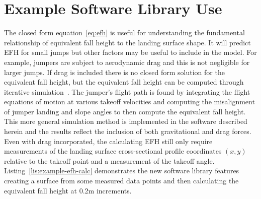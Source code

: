 \documentclass[smallextended]{svjour3}       %
\begin{document}
\appendix

\section{Example Software Library Use}
\label{sec:example}
%
The closed form equation~\ref{eq:efh} is useful for understanding the
fundamental relationship of equivalent fall height to the landing surface
shape. It will predict EFH for small jumps but other factors may be useful to
include in the model. For example, jumpers are subject to aerodynamic drag and
this is not negligible for larger jumps. If drag is included there is no closed
form solution for the equivalent fall height, but the equivalent fall height
can be computed through iterative simulation~\cite{Levy2015}. The jumper's
flight path is found by integrating the flight equations of motion at various
takeoff velocities and computing the misalignment of jumper landing and slope
angles to then compute the equivalent fall height. This more general simulation
method is implemented in the software described herein and the results reflect
the inclusion of both gravitational and drag forces. Even with drag
incorporated, the calculating EFH still only require measurements of the
landing surface cross-sectional profile coordinates $(x,y)$ relative to the
takeoff point and a measurement of the takeoff angle.
Listing~\ref{lis:example-efh-calc} demonstrates the new software library
features creating a surface from some measured data points and then calculating
the equivalent fall height at 0.2\si{\meter} increments.
%
\end{document}
